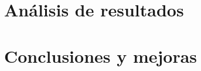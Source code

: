 \documentclass[12pt]{report} %
\begin{document}
    \chapter{Análisis de resultados}
    \label{chap:resultados}

    \chapter{Conclusiones y mejoras}
    \label{chap:conclusion}



    \clearpage

    \label{chap:bibliography}
    \printbibliography


\end{document}
